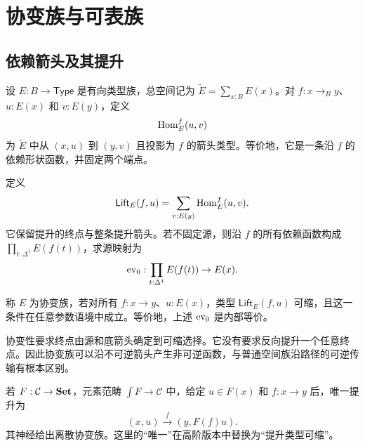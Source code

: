 \chapter{协变族与可表族}
\section{依赖箭头及其提升}
\begin{definition}[依赖箭头]
设 $E:B\to\mathsf{Type}$ 是有向类型族，总空间记为 $\widetilde E=\sum_{x:B}E(x)$。对 $f:x\to_B y$、$u:E(x)$ 和 $v:E(y)$，定义
\[
\operatorname{Hom}_E^f(u,v)
\]
为 $\widetilde E$ 中从 $(x,u)$ 到 $(y,v)$ 且投影为 $f$ 的箭头类型。等价地，它是一条沿 $f$ 的依赖形状函数，并固定两个端点。
\end{definition}
\begin{definition}[固定源的提升类型]
定义
\[
\mathsf{Lift}_E(f,u)=\sum_{v:E(y)}\operatorname{Hom}_E^f(u,v).
\]
它保留提升的终点与整条提升箭头。若不固定源，则沿 $f$ 的所有依赖函数构成 $\prod_{t:\Delta^1}E(f(t))$，求源映射为
\[
\operatorname{ev}_0:\prod_{t:\Delta^1}E(f(t))\to E(x).
\]
\end{definition}
\begin{definition}[协变族]\label{def:covariant}
称 $E$ 为协变族，若对所有 $f:x\to y$、$u:E(x)$，类型 $\mathsf{Lift}_E(f,u)$ 可缩，且这一条件在任意参数语境中成立。等价地，上述 $\operatorname{ev}_0$ 是内部等价。
\end{definition}
\begin{remark}
协变性要求终点由源和底箭头确定到可缩选择。它没有要求反向提升一个任意终点。因此协变族可以沿不可逆箭头产生非可逆函数，与普通空间族沿路径的可逆传输有根本区别。
\end{remark}
\begin{example}[集合值函子的元素范畴]
若 $F:\mathcal C\to\mathbf{Set}$，元素范畴 $\int F\to\mathcal C$ 中，给定 $u\in F(x)$ 和 $f:x\to y$ 后，唯一提升为
\[
(x,u)\xrightarrow{f}(y,F(f)u).
\]
其神经给出离散协变族。这里的“唯一”在高阶版本中替换为“提升类型可缩”。
\end{example}

